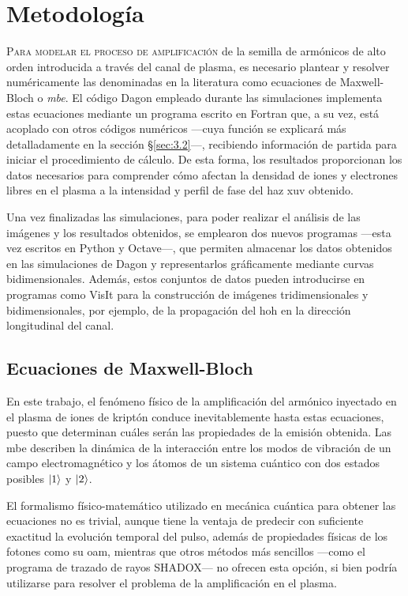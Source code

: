 \chapter{Metodología}\label{cap:3}
\lettrine{P}{ara modelar el proceso de amplificación} de la semilla de armónicos de alto orden introducida a través del canal de plasma, es necesario plantear y resolver numéricamente las denominadas en la literatura como ecuaciones de Maxwell-Bloch o \emph{\acrfull{mbe}}. El código Dagon empleado durante las simulaciones implementa estas ecuaciones mediante un programa escrito en Fortran que, a su vez, está acoplado con otros códigos numéricos ---cuya función se explicará más detalladamente en la sección \S\ref{sec:3.2}---, recibiendo información de partida para iniciar el procedimiento de cálculo. De esta forma, los resultados proporcionan los datos necesarios para comprender cómo afectan la densidad de iones y electrones libres en el plasma a la intensidad y perfil de fase del haz \acrshort{xuv} obtenido. 

Una vez finalizadas las simulaciones, para poder realizar el análisis de las imágenes y los resultados obtenidos, se emplearon dos nuevos programas ---esta vez escritos en Python y Octave---, que permiten almacenar los datos obtenidos en las simulaciones de Dagon y representarlos gráficamente mediante curvas bidimensionales. Además, estos conjuntos de datos pueden introducirse en programas como VisIt para la construcción de imágenes tridimensionales y bidimensionales, por ejemplo, de la propagación del \acrshort{hoh} en la dirección longitudinal del canal.

\section{Ecuaciones de Maxwell-Bloch}\label{sec:3.1}
En este trabajo, el fenómeno físico de la amplificación del armónico inyectado en el plasma de iones de kriptón conduce inevitablemente hasta estas ecuaciones, puesto que determinan cuáles serán las propiedades de la emisión obtenida. Las \acrshort{mbe} describen la dinámica de la interacción entre los modos de vibración de un campo electromagnético y los átomos de un sistema cuántico con dos estados posibles $\left|1\right\rangle$ y $\left|2\right\rangle$. 

El formalismo físico-matemático utilizado en mecánica cuántica para obtener las ecuaciones no es trivial\autocite{cohen-tannoudjiQuantumMechanicsVolume2019a,Sakurai2020,milonniLasers1988}, aunque tiene la ventaja de predecir con suficiente exactitud la evolución temporal del pulso, además de propiedades físicas de los fotones como su \acrshort{oam}, mientras que otros métodos más sencillos ---como el programa de trazado de rayos SHADOX--- no ofrecen esta opción, si bien podría utilizarse para resolver el problema de la amplificación en el plasma. 

